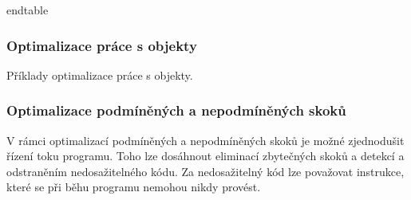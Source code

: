 end{table}

\subsubsection{Optimalizace práce s objekty}

\begin{table}[ht]
\begin{tpatterns}
\end{tpatterns}
\caption{Příklady optimalizace práce s objekty.}
\label{tab:objects}
\end{table}


\subsubsection{Optimalizace podmíněných a nepodmíněných skoků} %

V rámci optimalizací podmíněných a nepodmíněných skoků je možné zjednodušit řízení toku programu. Toho lze dosáhnout eliminací zbytečných skoků a detekcí a odstraněním nedosažitelného kódu. Za nedosažitelný kód lze považovat instrukce, které se při běhu programu nemohou nikdy provést. 

